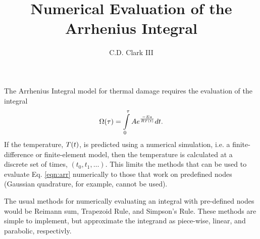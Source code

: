 \documentclass{article}
\title{Numerical Evaluation of the Arrhenius Integral}
\author{C.D. Clark III}
\begin{document}
\maketitle

The Arrhenius
Integral model for thermal damage requires the evaluation of the integral\cite{WELCH--2011--optical-thermalresponseoflaser-irradiatedtissue}
\begin{equation}
  \label{eqn:arr}
  \Omega\qty(\tau) = \int\limits_{0}^{\tau} A e^{\frac{-Ea}{RT\qty(t)}} dt.
\end{equation}
If the temperature, $T\qty(t)$, is predicted using a numerical simulation, i.e. a finite-difference or finite-element model, then the temperature is calculated at a discrete set of times, $(t_0, t_1,
\ldots)$. This limits the methods that can be used to evaluate Eq. \ref{eqn:arr} numerically to those that work on predefined nodes (Gaussian quadrature, for example, cannot be used).

The usual methods for numerically evaluating an integral with pre-defined nodes would be Reimann sum, Trapezoid Rule,
and Simpson's Rule. These methods are simple to implement, but approximate the integrand as piece-wise, linear, and
parabolic, respectivly.
\end{document}
